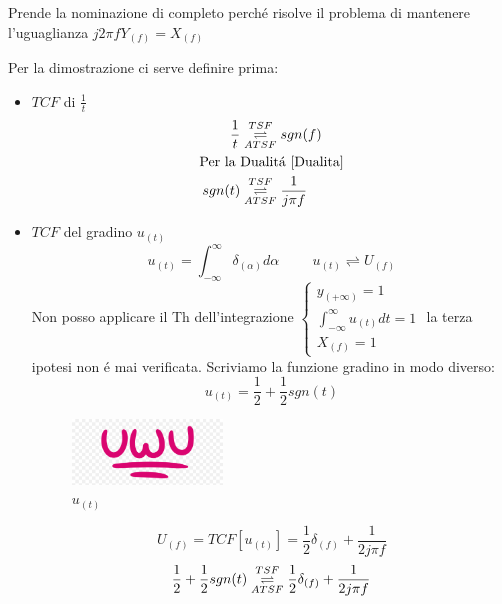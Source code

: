                     Prende la nominazione di completo perché risolve il problema di mantenere l'uguaglianza $j2\pi fY_{(f)} = X_{(f)}$
                    
                    Per la dimostrazione ci serve definire prima:
                    \begin{itemize}
                        \item{
                            $TCF$ di $\frac{1}{t}$ 
                                \begin{align}
                                    \frac{1}{t} &\overunderset{TSF}{ATSF}{\rightleftharpoons}  sgn(f) \nonumber \\
                                    \text{Per la }&\text{Dualitá \ref{Dualita}}\nonumber \\
                                    sgn(t) &\overunderset{TSF}{ATSF}{\rightleftharpoons} \frac{1}{j\pi f} \nonumber
                                \end{align}
                        }
                        \item{
                            $TCF$ del gradino $u_{(t)}$
                            \[
                              u_{(t)} = \int_{-\infty}^{\infty} \delta_{(\alpha)} d\alpha \hspace{1cm}   u_{(t)} \rightleftharpoons U_{(f)}
                            \] 
                            Non posso applicare il Th dell'integrazione $
                            \begin{cases}
                                y_{(+\infty)} = 1\nonumber \\    
                                \int_{-\infty}^{\infty} u_{(t)} dt  = 1\nonumber \\   
                                X_{(f)} = 1 \nonumber    
                            \end{cases}$
                            la terza ipotesi non é mai verificata. Scriviamo la funzione gradino in modo diverso:
                            \[
                                u_{(t)} = \frac{1}{2}+\frac{1}{2}sgn(t)
                            \] 
                            \begin{figure}[H]
                                \centering
                                \includegraphics[width=4cm]{media/uwu.png}
                                \caption{$u_{(t)}$}
                                \label{fig:gradino alternativo}
                            \end{figure}
                            \[
                                U_{(f)} = TCF[u_{(t)}] = \frac{1}{2}\delta_{(f)}+\frac{1}{2j\pi f}
                            \]
                            \[
                                \frac{1}{2}+\frac{1}{2}sgn(t) \overunderset{TSF}{ATSF}{\rightleftharpoons} \frac{1}{2}\delta_{(f)}+\frac{1}{2j\pi f} 
                            \]
                        }
                    \end{itemize}                    

